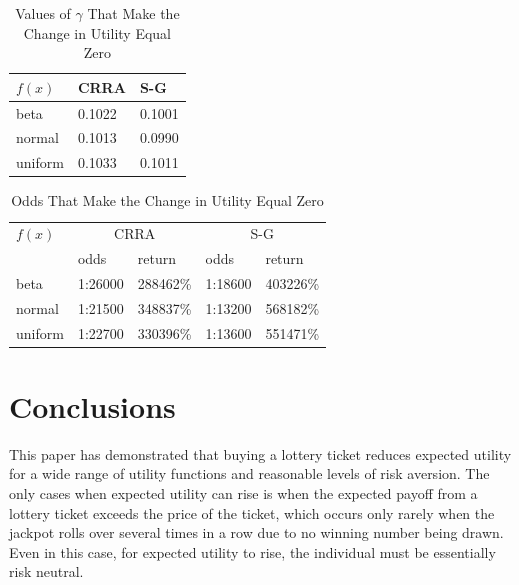 \documentclass[letterpaper,12pt]{article}
\numberwithin{equation}{section}
\numberwithin{figure}{section}
\numberwithin{table}{section}
\begin{document}
\begin{spacing}{1.5}
	\begin{table}[ht] 
		\caption{Values of $\gamma$ That Make the Change in Utility Equal Zero}
		\label{tab_lottery3}
		\centering
		\begin{tabular}{|l|ll|}
		    \hline
			$f(x)$ & CRRA & S-G \\
			\hline
			beta & 0.1022 & 0.1001 \\
			normal & 0.1013 & 0.0990 \\
			uniform & 0.1033 & 0.1011 \\
			\hline
		\end{tabular}
	\end{table}

	\begin{table}[ht] 
		\caption{Odds That Make the Change in Utility Equal Zero}
		\label{tab_lottery4}
		\centering
		\begin{tabular}{|l|ll|ll|}
		    \hline
			$f(x)$ & \multicolumn{2}{c}{CRRA} & \multicolumn{2}{c}{S-G} \\
			& odds & return & odds & return \\
			\hline
			beta & 1:26000 & 288462\% & 1:18600 & 403226\% \\
			normal & 1:21500 & 348837\% & 1:13200 & 568182\% \\
			uniform & 1:22700 & 330396\% & 1:13600 & 551471\% \\
			\hline
		\end{tabular}
	\end{table}


\FloatBarrier

\section{Conclusions} \label{sec_concl}

	This paper has demonstrated that buying a lottery ticket reduces expected utility for a wide range of utility functions and reasonable levels of risk aversion.  The only cases when expected utility can rise is when the expected payoff from a lottery ticket exceeds the price of the ticket, which occurs only rarely when the jackpot rolls over several times in a row due to no winning number being drawn.  Even in this case, for expected utility to rise, the individual must be essentially risk neutral.
	

%

\end{spacing}
\end{document}
